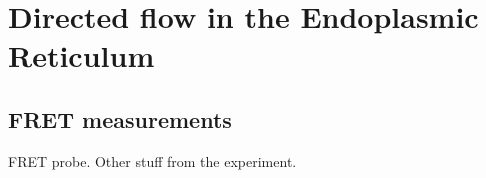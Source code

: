 
\chapter{Directed flow in the Endoplasmic Reticulum}

\section{FRET measurements}
FRET probe. Other stuff from the experiment. 